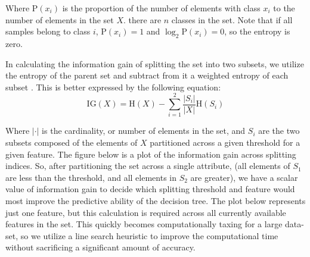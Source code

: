 Where $\mathrm{P}(x_i)$ is the proportion of the number of elements with class $x_i$ to the number of elements in the set $X$. there are $n$ classes in the set. Note that if all samples belong to class $i$, $\mathrm{P}(x_i) = 1$ and $\log_2 \mathrm{P}(x_i) = 0$, so the entropy is zero. 

In calculating the information gain of splitting the set into two subsets, we utilize the entropy of the parent set and subtract from it a weighted entropy of each subset \cite{wiki:IG} . This is better expressed by the following equation:
%
\begin{equation}
  \mathrm{IG}(X) = \mathrm{H}(X) - \sum_{i=1}^{2} \frac{|S_i|}{|X|} \mathrm{H}(S_i)
\end{equation}

Where $|\cdot|$ is the cardinality, or number of elements in the set, and $S_i$ are the two subsets composed of the elements of $X$ partitioned across a given threshold for a given feature. The figure below is a plot of the information gain across splitting indices. So, after partitioning the set across a single attribute, (all elements of $S_1$ are less than the threshold, and all elements in $S_2$ are greater), we have a scalar value of information gain to decide which splitting threshold and feature would most improve the predictive ability of the decision tree. The plot below represents just one feature, but this calculation is required across all currently available features in the set. This quickly becomes computationally taxing for a large data-set, so we utilize a line search heuristic to improve the computational time without sacrificing a significant amount of accuracy. 

